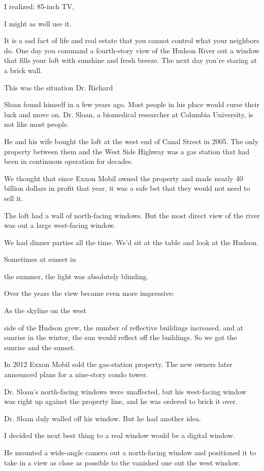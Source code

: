 I realized: 85-inch TV,

I might as well use it.

It is a sad fact of life and real estate that you cannot control what
your neighbors do. One day you command a fourth-story view of the Hudson
River out a window that fills your loft with sunshine and fresh breeze.
The next day you're staring at a brick wall.

This was the situation Dr. Richard

Sloan found himself in a few years ago. Most people in his place would
curse their luck and move on. Dr. Sloan, a biomedical researcher at
Columbia University, is not like most people.

He and his wife bought the loft at the west end of Canal Street in 2005.
The only property between them and the West Side Highway was a gas
station that had been in continuous operation for decades.

We thought that since Exxon Mobil owned the property and made nearly 40
billion dollars in profit that year, it was a safe bet that they would
not need to sell it.

The loft had a wall of north-facing windows. But the most direct view of
the river was out a large west-facing window.

We had dinner parties all the time. We'd sit at the table and look at
the Hudson.

Sometimes at sunset in

the summer, the light was absolutely blinding.

Over the years the view became even more impressive:

As the skyline on the west

side of the Hudson grew, the number of reflective buildings increased,
and at sunrise in the winter, the sun would reflect off the buildings.
So we got the sunrise and the sunset.

In 2012 Exxon Mobil sold the gas-station property. The new owners later
announced plans for a nine-story condo tower.

Dr. Sloan's north-facing windows were unaffected, but his west-facing
window was right up against the property line, and he was ordered to
brick it over.

Dr. Sloan duly walled off his window. But he had another idea.

I decided the next best thing to a real window would be a digital
window.

He mounted a wide-angle camera out a north-facing window and positioned
it to take in a view as close as possible to the vanished one out the
west window.

